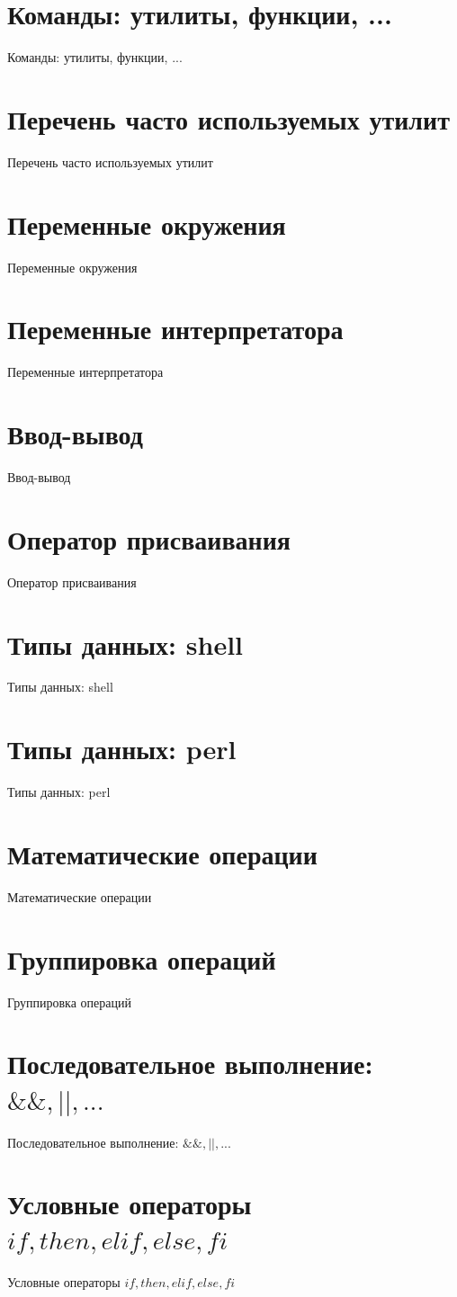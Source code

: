 \documentclass[hyperref={unicode=true}]{beamer}
\begin{document}
\newcommand{\iframe}[1]{
   \section{#1}\begin{frame}[fragile]{#1}\par\vspace{-1em}
}
\newcommand{\pframe}[1]{
   \begin{frame}[fragile]{#1}\par\vspace{-1em}
}


\iframe{Команды: утилиты, функции, ...}
\end{frame}

\iframe{Перечень часто используемых утилит}
\end{frame}

\iframe{Переменные окружения}
\end{frame}

\iframe{Переменные интерпретатора}
\end{frame}

\iframe{Ввод-вывод}
\end{frame}

\iframe{Оператор присваивания}
\end{frame}

\iframe{Типы данных: shell}
\end{frame}

\iframe{Типы данных: perl}
\end{frame}

\iframe{Математические операции}
\end{frame}

\iframe{Группировка операций}
\end{frame}

\iframe{Последовательное выполнение: $\&\&, ||, ...$}
\end{frame}

\iframe{Условные операторы $if, then, elif, else, fi$}
\end{frame}
\end{document}
